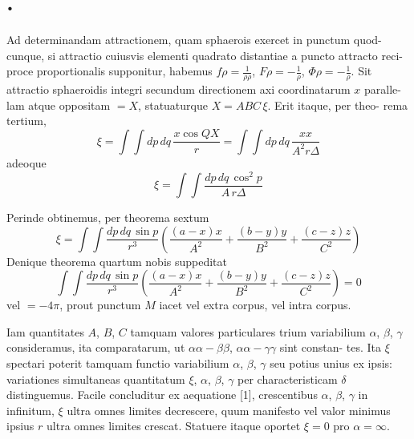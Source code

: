 \documentclass[12pt,a4paper]{article}
\theoremstyle{gauss}
\begin{document}
\section*{%
%
\thesection.}

Ad determinandam attractionem, quam sphaerois exercet in punctum quod-
cunque, si attractio cuiusvis elementi quadrato distantiae a puncto attracto reci-
proce proportionalis supponitur, habemus $f\rho = \frac{1}{\rho\rho}$, $F\rho = -\frac{1}{\rho}$, $\Phi\rho = -\frac{1}{\rho}$. Sit
attractio sphaeroidis integri secundum directionem axi coordinatarum $x$ paralle-
lam atque oppositam $=X$, statuaturque $X = ABC\,\xi$. Erit itaque, per theo-
rema tertium,
\[
\xi = \int\!\!\int dp\,dq\,\frac{x\cos QX}{r} = \int\!\!\int dp\,dq\,\frac{xx}{A^2 r\Delta}
\]
adeoque
\[
\xi = \int\!\!\int \frac{dp\,dq\,\cos^2 p}{A\,r\Delta}
\]

Perinde obtinemus, per theorema sextum
\[
\xi = \int\!\!\int \frac{dp\,dq\,\sin p}{r^3}\left(\frac{(a-x)x}{A^2} + \frac{(b-y)y}{B^2} + \frac{(c-z)z}{C^2}\right)
\]
Denique theorema quartum nobis suppeditat
\[
\int\!\!\int \frac{dp\,dq\,\sin p}{r^3}\left(\frac{(a-x)x}{A^2} + \frac{(b-y)y}{B^2} + \frac{(c-z)z}{C^2}\right) = 0
\]
vel $=-4\pi$, prout punctum $M$ iacet vel extra corpus, vel intra corpus.

\newpage
\setcounter{page}{25}

Iam quantitates $A$, $B$, $C$ tamquam valores particulares trium variabilium
$\alpha$, $\beta$, $\gamma$ consideramus, ita comparatarum, ut $\alpha\alpha-\beta\beta$, $\alpha\alpha-\gamma\gamma$ sint constan-
tes. Ita $\xi$ spectari poterit tamquam functio variabilium $\alpha$, $\beta$, $\gamma$ seu potius unius
ex ipsis: variationes simultaneas quantitatum $\xi$, $\alpha$, $\beta$, $\gamma$ per characteristicam $\delta$
distinguemus. Facile concluditur ex aequatione [1], crescentibus $\alpha$, $\beta$, $\gamma$ in
infinitum, $\xi$ ultra omnes limites decrescere, quum manifesto vel valor minimus
ipsius $r$ ultra omnes limites crescat. Statuere itaque oportet $\xi=0$ pro $\alpha=\infty$.
\end{document}
